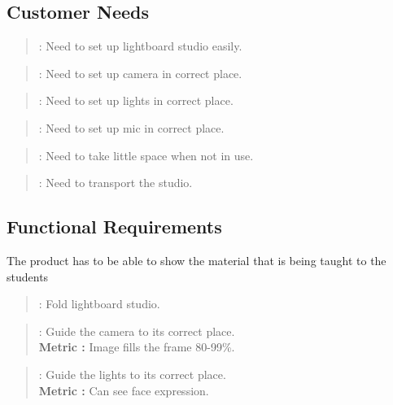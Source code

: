 \documentclass[a4paper]{jpconf}
\begin{document}
\subsection{Customer Needs}\label{CN}

\begin{quote}
	\textbf{} : Need to set up lightboard studio easily.
\end{quote}

\begin{quote}
	\textbf{} : Need to set up camera in correct place.
\end{quote}

\begin{quote} 
	\textbf{} : Need to set up lights in correct place.
\end{quote}

\begin{quote} 
	\textbf{} :  Need to set up mic in correct place.
\end{quote}

\begin{quote} 
	\textbf{} :  Need to take little space when not in use.
\end{quote}

\begin{quote} 
	\textbf{} :  Need to transport the studio.
\end{quote}

\subsection{Functional Requirements} \label{FR}
The product has to be able to show the material that is being taught to the students
\begin{quote} 
	\textbf{} : Fold lightboard studio.
\end{quote}

\begin{quote} 
	\textbf{} :  Guide  the camera to its correct place.
	\\ \textbf{Metric :} Image fills the frame 80-99\%.
\end{quote}

\begin{quote} 
	\textbf{} :  Guide the lights  to its correct place.
	\\ \textbf{Metric :} Can see face expression.
\end{quote}
\end{document}

